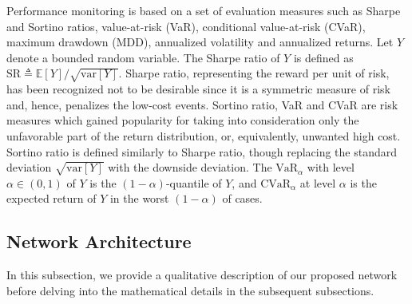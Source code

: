 \documentclass{article}
\begin{document}

Performance monitoring is based on a set of evaluation measures such as Sharpe and Sortino ratios, value-at-risk (VaR), conditional value-at-risk (CVaR), maximum drawdown (MDD), annualized volatility and annualized returns. Let $Y$ denote a bounded random variable. The Sharpe ratio of $Y$ is defined as
$
    \text{SR}\triangleq{\mathbb{E}[Y]}/{\sqrt{\text{var}[Y]}}.
$
Sharpe ratio, representing the reward per unit of risk, has been recognized not to be desirable since it is a symmetric measure of risk and, hence, penalizes the low-cost events. Sortino ratio, VaR and CVaR are risk measures which gained popularity for taking into consideration only the unfavorable part of the return distribution, or, equivalently, unwanted high cost. Sortino ratio is defined similarly to Sharpe ratio,  though replacing the standard deviation $\sqrt{\text{var}[Y]}$ with the downside deviation. The $\text{VaR}_{\alpha}$ with level $\alpha\in(0,1)$ of $Y$ is the $(1-\alpha)$-quantile of $Y$, and $\text{CVaR}_{\alpha}$ at level $\alpha$ is the  expected return of $Y$ in the worst $(1-\alpha)$ of cases.

\subsection{Network Architecture}
In this subsection, we provide a qualitative description of our proposed network before delving into the mathematical details in the subsequent subsections.
\end{document}
